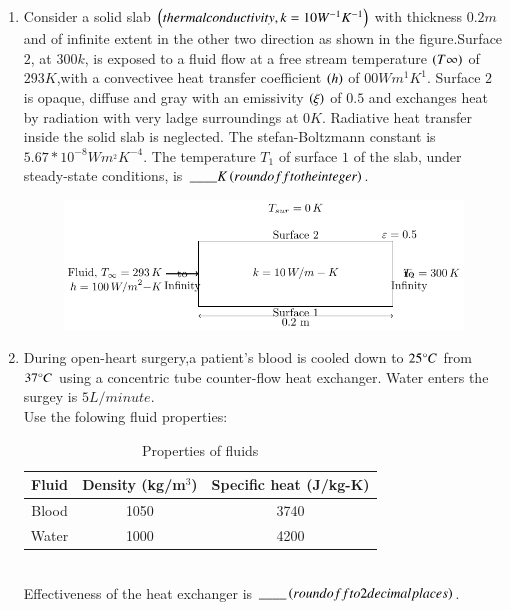 \documentclass[journal]{IEEEtran}
\begin{document}
\begin{enumerate}
     \item Consider a solid slab $\left(thermal conductivity, k=10 W^{-1}K^{-1}\right)$ with thickness $0.2 m$ and of infinite extent in the other two direction as shown in the figure.Surface $2$, at $300 k$, is exposed to a fluid flow at a free stream temperature $\left(T\infty\right)$ of $293 K$,with a convectivee heat transfer coefficient $\left(h\right)$ of $00 Wm^{1}K^{1}$. Surface $2$ is opaque, diffuse and gray with an emissivity $\left(\xi\right)$ of $0.5$ and exchanges heat by radiation with very ladge surroundings at $0 K$. Radiative heat transfer inside the solid slab is neglected. The stefan-Boltzmann constant is $5.67*10^{-8}Wm^{_2}K^{-4}$. The temperature $T_{1}$ of surface $1$ of the slab, under steady-state conditions, is $\_\_\_\_K \left(round off to the integer\right)$.\\
\begin{figure}[h!]
         \centering
        \includegraphics[width=0.7\linewidth]{figure/fig2/fig2.pdf}
		\caption{}
        \label{stemplot}

\end{figure}

     \item During open-heart surgery,a patient's blood is cooled down to $25\degree C$ from $37\degree C$ using a concentric tube counter-flow heat exchanger. Water enters the surgey is $5 L/minute$.\\
     Use the folowing fluid properties:\\
\begin{table}[h!]
\centering
\begin{tabular}{|c|c|c|}
\hline
\textbf{Fluid} & \textbf{Density (kg/m$^3$)} & \textbf{Specific heat (J/kg-K)} \\
\hline
Blood & 1050 & 3740 \\
\hline
Water & 1000 & 4200 \\
\hline
\end{tabular}
\caption{Properties of fluids}
\end{table}\\
     Effectiveness of the heat exchanger is $\_\_\_\_ \left(round off to 2 decimal places\right)$.





     
 \end{enumerate}
\end{document}
